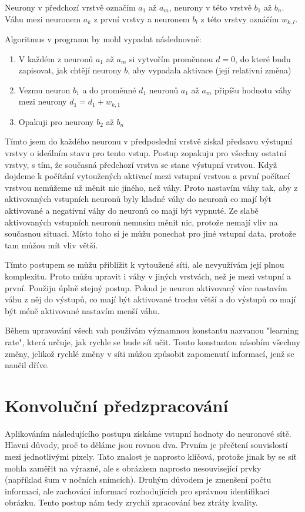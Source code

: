 \documentclass[12pt,a4paper]{report}
\begin{document}
	Neurony v předchozí vrstvě označím $a_1$ až $a_m$, neurony v této vrstvě $b_1$ až $b_n$. Váhu mezi neuronem $a_k$ z první vrstvy a neuronem $b_l$ z této vrstvy oznáčím $w_{k,l}$.
	
	Algoritmus v programu by mohl vypadat následnovně:
	\begin{enumerate}
		\item V každém z neuronů $a_1$ až $a_m$ si vytvořím proměnnou $d=0$, do které budu zapisovat, jak chtějí neurony $b$, aby vypadala aktivace (její relativní změna)
		\item Vezmu neuron $b_1$ a do proměnné $d_1$ neuronů $a_1$ až $a_m$ připíšu hodnotu váhy mezi neurony $d_1=d_1+w_{k,1}$
		\item Opakuji pro neurony $b_2$ až $b_n$
	\end{enumerate}
	Tímto jsem do každého neuronu v předposlední vrstvě získal předsavu výstupní vrstvy o ideálním stavu pro tento vstup. Postup zopakuju pro všechny ostatní vrstvy, s tím, že současná předchozí vrstva se stane výstupní vrstvou. Když dojdeme k počítání vytoužených aktivací mezi vstupní vrstvou a první počítací vrstvou nemůžeme už měnit nic jiného, než váhy. Proto nastavím váhy tak, aby z aktivovaných vstupních neuronů byly kladné váhy do neuronů co mají být aktivované a negativní váhy do neuronů co mají být vypnuté. Ze slabě aktivovaných vstupních neuronů nemusím měnit nic, protože nemají vliv na současnou situaci. Místo toho si je můžu ponechat pro jiné vstupní data, protože tam můžou mít vliv větší.
	
	Tímto postupem se můžu přiblížit k vytoužené síti, ale nevyužívám její plnou komplexitu. Proto můžu upravit i váhy v jiných vrstvách, než je mezi vstupní a první. Použiju úplně stejný postup. Pokud je neuron aktivovaný více nastavím váhu z něj do výstupů, co mají být aktivované trochu větší a do výstupů co mají být méně aktivované nastavím menší váhu.
	
	Během upravování všech vah používám významnou konstantu nazvanou "learning rate", která určuje, jak rychle se bude síť učit. Touto konstantou násobím všechny změny, jelikož rychlé změny v síti můžou způsobit zapomenutí informací, jenž se naučil dříve.
	
\chapter{Konvoluční předzpracování}
Aplikováním následujícího postupu získáme vstupní hodnoty do neuronové sítě. Hlavní důvody, proč to děláme jsou rovnou dva. Prvním je přečtení souvislostí mezi jednotlivými pixely. Tato znalost je naprosto klíčová, protože jinak by se síť mohla zaměřit na výrazné, ale s obrázkem naprosto nesouvisející prvky (například šum v nočních snímcích). Druhým důvodem je zmenšení počtu informací, ale zachování informací rozhodujících pro správnou identifikaci obrázku. Tento postup nám tedy zrychlí zpracování bez ztráty kvality.
\end{document}

